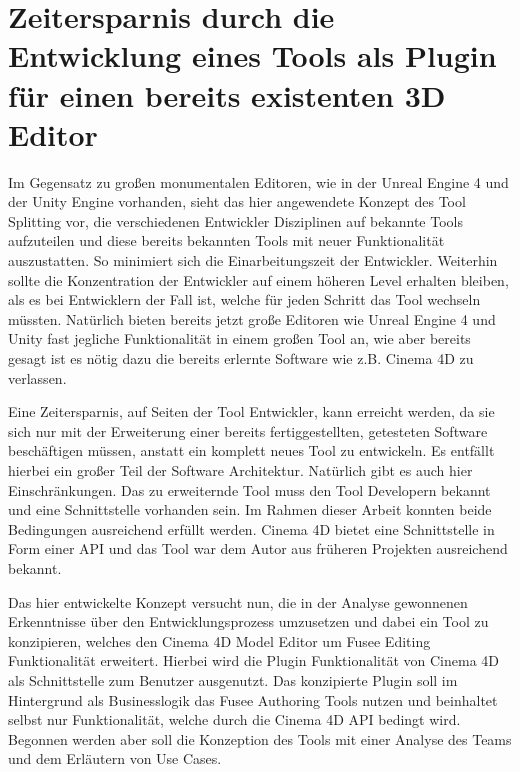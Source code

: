 \documentclass[pagesize, paper=a4, fontsize=12pt, titlepage=true, headings=small, headnosepline, abstractoff, liststotoc, nochapterprefix, plainheadsepline, twoside]{scrreprt}
\begin{document}
\section{Zeitersparnis durch die Entwicklung eines Tools als Plugin für einen bereits existenten 3D Editor}
Im Gegensatz zu großen monumentalen Editoren, wie in der Unreal Engine 4 und der Unity Engine vorhanden, sieht das hier angewendete Konzept des Tool Splitting vor, die verschiedenen Entwickler Disziplinen auf bekannte Tools aufzuteilen und diese bereits bekannten Tools mit neuer Funktionalität auszustatten. So minimiert sich die Einarbeitungszeit der Entwickler. Weiterhin sollte die Konzentration der Entwickler auf einem höheren Level erhalten bleiben, als es bei Entwicklern der Fall ist, welche für jeden Schritt das Tool wechseln müssten. Natürlich bieten bereits jetzt große Editoren wie Unreal Engine 4 und Unity fast jegliche Funktionalität in einem großen Tool an, wie aber bereits gesagt ist es nötig dazu die bereits erlernte Software wie z.B. Cinema 4D zu verlassen.

Eine Zeitersparnis, auf Seiten der Tool Entwickler, kann erreicht werden, da sie sich nur mit der Erweiterung einer bereits fertiggestellten, getesteten Software beschäftigen müssen, anstatt ein komplett neues Tool zu entwickeln. Es entfällt hierbei ein großer Teil der Software Architektur. Natürlich gibt es auch hier Einschränkungen. Das zu erweiternde Tool muss den Tool Developern bekannt und eine Schnittstelle vorhanden sein. Im Rahmen dieser Arbeit konnten beide Bedingungen ausreichend erfüllt werden. Cinema 4D bietet eine Schnittstelle in Form einer API und das Tool war dem Autor aus früheren Projekten ausreichend bekannt.

Das hier entwickelte Konzept versucht nun, die in der Analyse gewonnenen Erkenntnisse über den Entwicklungsprozess umzusetzen und dabei ein Tool zu konzipieren, welches den Cinema 4D Model Editor um Fusee Editing Funktionalität erweitert. Hierbei wird die Plugin Funktionalität von Cinema 4D als Schnittstelle zum Benutzer ausgenutzt. Das konzipierte Plugin soll im Hintergrund als Businesslogik das Fusee Authoring Tools nutzen und beinhaltet selbst nur Funktionalität, welche durch die Cinema 4D API bedingt wird. Begonnen werden aber soll die Konzeption des Tools mit einer Analyse des Teams und dem Erläutern von Use Cases.
\end{document}
